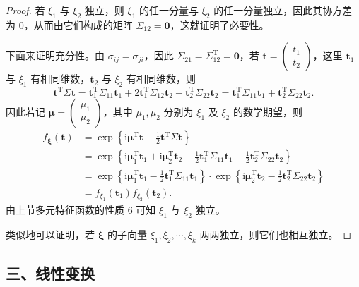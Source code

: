 \documentclass[../../main.tex]{subfiles}
\begin{document}
\begin{proof}
若 $\xi_1$ 与 $\xi_2$ 独立，则 $\xi_1$ 的任一分量与 $\xi_2$ 的任一分量独立，因此其协方差为 $0$，从而由它们构成的矩阵 $\Sigma_{12}=\boldsymbol{0}$，这就证明了必要性。

下面来证明充分性。由 $\sigma_{ij}=\sigma_{ji}$，因此 $\Sigma_{21}=\Sigma_{12}^{\mathrm{T}}=\boldsymbol{0}$，若 $\boldsymbol{t}=\begin{pmatrix}t_1\\t_2\end{pmatrix}$，这里 $\boldsymbol{t}_1$ 与 $\xi_1$ 有相同维数，$\boldsymbol{t}_2$ 与 $\xi_2$ 有相同维数，则
\[
\boldsymbol{t}^{\mathrm{T}}\Sigma\boldsymbol{t}=\boldsymbol{t}_1^{\mathrm{T}}\Sigma_{11}\boldsymbol{t}_1+2\boldsymbol{t}_1^{\mathrm{T}}\Sigma_{12}\boldsymbol{t}_2+\boldsymbol{t}_2^{\mathrm{T}}\Sigma_{22}\boldsymbol{t}_2=\boldsymbol{t}_1^{\mathrm{T}}\Sigma_{11}\boldsymbol{t}_1+\boldsymbol{t}_2^{\mathrm{T}}\Sigma_{22}\boldsymbol{t}_2.
\]
因此若记 $\boldsymbol{\mu}=\begin{pmatrix}\mu_1\\\mu_2\end{pmatrix}$，其中 $\mu_1,\mu_2$ 分别为 $\xi_1$ 及 $\xi_2$ 的数学期望，则
\begin{align*}
f_{\boldsymbol{\xi}}(\boldsymbol{t})&=\exp\left\{\mathrm{i}\boldsymbol{\mu}^{\mathrm{T}}\boldsymbol{t}-\frac12\boldsymbol{t}^{\mathrm{T}}\Sigma\boldsymbol{t}\right\}\\
&=\exp\left\{\mathrm{i}\boldsymbol{\mu}_1^{\mathrm{T}}\boldsymbol{t}_1+\mathrm{i}\boldsymbol{\mu}_2^{\mathrm{T}}\boldsymbol{t}_2-\frac12\boldsymbol{t}_1^{\mathrm{T}}\Sigma_{11}\boldsymbol{t}_1-\frac12\boldsymbol{t}_2^{\mathrm{T}}\Sigma_{22}\boldsymbol{t}_2\right\}\\
&=\exp\left\{\mathrm{i}\boldsymbol{\mu}_1^{\mathrm{T}}\boldsymbol{t}_1-\frac12\boldsymbol{t}_1^{\mathrm{T}}\Sigma_{11}\boldsymbol{t}_1\right\}\cdot\exp\left\{\mathrm{i}\boldsymbol{\mu}_2^{\mathrm{T}}\boldsymbol{t}_2-\frac12\boldsymbol{t}_2^{\mathrm{T}}\Sigma_{22}\boldsymbol{t}_2\right\}\\
&=f_{\xi_1}(\boldsymbol{t}_1)f_{\xi_2}(\boldsymbol{t}_2).
\end{align*}
由上节多元特征函数的性质 6 可知 $\xi_1$ 与 $\xi_2$ 独立。

类似地可以证明，若 $\boldsymbol{\xi}$ 的子向量 $\xi_1,\xi_2,\cdots,\xi_k$ 两两独立，则它们也相互独立。
\end{proof}

\subsection*{三、线性变换}
\end{document}
